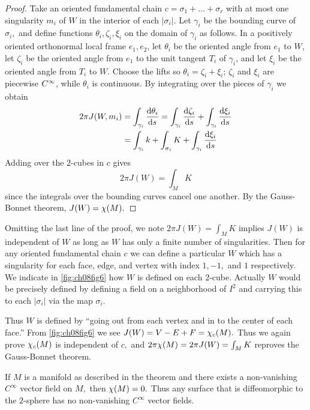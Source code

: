 \documentclass[../main]{subfiles}
\begin{document}
\begin{proof}
Take an oriented fundamental chain $c=\sigma_1+\ldots+\sigma_r$ with at most one singularity $m_i$ of $W$ in the interior of each $|\sigma_i|.$ Let $\gamma_i$ be the bounding curve of $\sigma_i,$ and define 
functions $\theta_i,\zeta_i,\xi_i$ on the domain of $\gamma_i$ as follows. In a positively oriented orthonormal local frame $e_1,e_2$, let $\theta_i$ be the oriented angle from $e_1$ to $W$, let $\zeta_i$ be the oriented angle from $e_1$ to the unit tangent $T_i$ of $\gamma_i$, and let $\xi_i$ be the oriented angle from $T_i$ to $W$. Choose the lifts so $\theta_i=\zeta_i+\xi_i$; $\zeta_i$ and $\xi_i$ are piecewise $C^\infty$, while $\theta_i$ is continuous.
By integrating over the pieces of $\gamma_i$ we obtain
\begin{align*}
    2\pi J(W,m_i)&=\int_{\gamma_i}\dfrac{\mathrm{d}\theta_i}{\mathrm{d}s}=\int_{\gamma_i}\dfrac{\mathrm{d}\zeta_i}{\mathrm{d}s}+\int_{\gamma_i}\dfrac{\mathrm{d}\xi_i}{\mathrm{d}s} \\
    &=\int_{\gamma_i}k+\int_{\sigma_i}K+\int_{\gamma_i}\dfrac{\mathrm{d}\xi_i}{\mathrm{d}s}
\end{align*}
Adding over the $2$-cubes in $c$ gives
\begin{equation}\tag{5}\label{eq:ch08.5}
    2\pi J(W)=\int_{M}K
\end{equation}
since the integrals over the bounding curves cancel one another. By the Gauss-Bonnet theorem, $J(W)=\chi(M).$
\end{proof}



Omitting the last line of the proof, we note $2\pi J(W)=\int_{M}K$ implies $J(W)$ is independent of $W$ as long as $W$ has only a finite number of singularities. Then for any oriented fundamental chain $c$ we can define a particular $W$ which has a singularity for each face, edge, and vertex with index $1,-1,$ and $1$ respectively. We indicate in \ref{fig:ch08fig6} how $W$ is defined on each $2$-cube. Actually $W$ would be precisely defined by defining a field on a neighborhood of $I^2$ and carrying this to each $|\sigma_i|$ via the map $\sigma_i.$



Thus $W$ is defined by ``going out from each vertex and in to the center of each face.'' From \ref{fig:ch08fig6} we see $J(W)=V-E+F=\chi_c(M).$ Thus we again prove $\chi_c(M)$ is independent of $c,$ and $2\pi\chi(M)=2\pi J(W)=\int_{M}K$ reproves the Gauss-Bonnet theorem. 



\begin{corollary} \label{thm:ch8.2.3}
If $M$ is a manifold as described in the theorem and there exists a non-vanishing $C^\infty$ vector field on $M,$ then $\chi(M)=0.$ Thus any surface that is diffeomorphic to the $2$-sphere has no non-vanishing $C^\infty$ vector fields.
\end{corollary}
\end{document}
